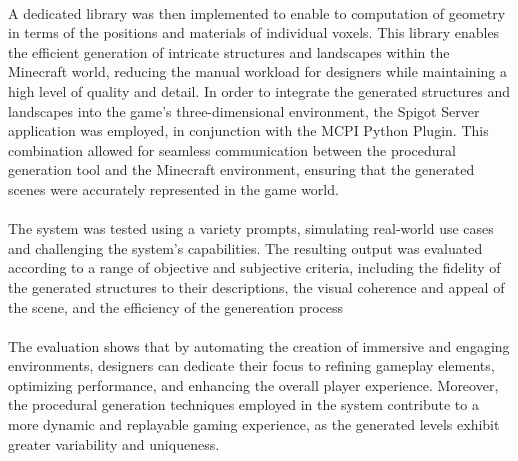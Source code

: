 \documentclass[11pt, a4paper]{article}
\begin{document}
\begin{flushleft}
\paragraph*{}
A dedicated library was then implemented to enable to computation of geometry in terms of the positions and materials of individual voxels.
This library enables the efficient generation of intricate structures and landscapes within the Minecraft world, reducing the manual workload for designers while maintaining a high level of quality and detail.
In order to integrate the generated structures and landscapes into the game's three-dimensional environment, the Spigot Server application was employed, in conjunction with the MCPI Python Plugin. This combination allowed for seamless communication between the procedural generation tool and the Minecraft environment, ensuring that the generated scenes were accurately represented in the game world.


\paragraph*{}
The system was tested using a variety prompts, simulating real-world use cases and challenging the system's capabilities. The resulting output was evaluated according to a range of objective and subjective criteria, including the fidelity of the generated structures to their descriptions, the visual coherence and appeal of the scene, and the efficiency of the genereation process

\paragraph*{}
The evaluation shows that by automating the creation of immersive and engaging environments, designers can dedicate their focus to refining gameplay elements, optimizing performance, and enhancing the overall player experience. Moreover, the procedural generation techniques employed in the system contribute to a more dynamic and replayable gaming experience, as the generated levels exhibit greater variability and uniqueness.

\end{flushleft}
\end{document}
